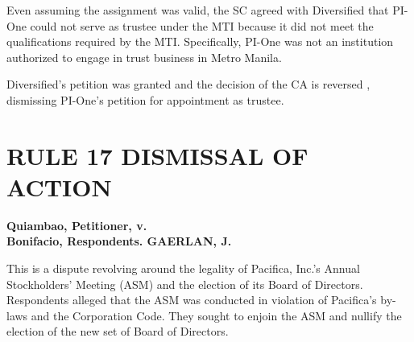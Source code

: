 \documentclass[
12pt,
oneside,
onehalfspacing,
headsepline
]{DigestCollection}
\begin{document}
Even assuming the assignment was valid, the SC agreed with Diversified that PI-One could not serve as trustee under the MTI because it did not meet the qualifications required by the MTI. Specifically, PI-One was not an institution authorized to engage in trust business in Metro Manila.

Diversified's petition was granted and the decision of the CA is reversed , dismissing PI-One's petition for appointment as trustee.

\chapter{RULE 17 DISMISSAL OF ACTION }
\label{efbe90a0-0a11-11ef-932c-63c852f65e48}


\label{d7c16e20-0a0f-11ef-932c-63c852f65e48}


\noindent\textbf{Quiambao, Petitioner, v. \\Bonifacio, Respondents. GAERLAN, J.}\vspace{0.4cm}

This is a dispute revolving around the legality of Pacifica, Inc.'s Annual Stockholders' Meeting (ASM) and the election of its Board of Directors. Respondents alleged that the ASM was conducted in violation of Pacifica's by-laws and the Corporation Code. They sought to enjoin the ASM and nullify the election of the new set of Board of Directors.
\end{document}
